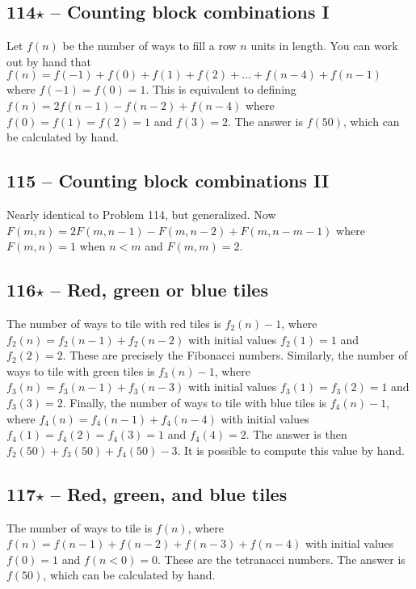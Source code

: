 \documentclass{article}
\begin{document}
\subsection*{114$\star$ -- Counting block combinations I} 
Let $f(n)$ be the number of ways to fill a row $n$ units in length. 
You can work out by hand that $f(n) = f(-1) + f(0) + f(1) + f(2) + \dotso + f(n-4) + f(n-1)$ where $f(-1) = f(0) = 1$. 
This is equivalent to defining $f(n) = 2f(n-1) - f(n-2) + f(n-4)$ where $f(0) = f(1) = f(2) = 1$ and $f(3) = 2$. 
The answer is $f(50)$, which can be calculated by hand.

\subsection*{115 -- Counting block combinations II} 
Nearly identical to Problem 114, but generalized. 
Now $F(m, n) = 2F(m, n-1) - F(m, n-2) + F(m, n-m-1)$ where $F(m, n) = 1$ when $n < m$ and $F(m, m) = 2$.

\subsection*{116$\star$ -- Red, green or blue tiles} 
The number of ways to tile with red tiles is $f_2(n)-1$, where $f_2(n) = f_2(n-1) + f_2(n-2)$ with initial values $f_2(1) = 1$ and $f_2(2) = 2$. 
These are precisely the Fibonacci numbers. 
Similarly, the number of ways to tile with green tiles is $f_3(n)-1$, where $f_3(n) = f_3(n-1) + f_3(n-3)$ with initial values $f_3(1) = f_3(2) = 1$ and $f_3(3) = 2$.  
Finally, the number of ways to tile with blue tiles is $f_4(n)-1$, where $f_4(n) = f_4(n-1) + f_4(n-4)$ with initial values $f_4(1) = f_4(2) = f_4(3) = 1$ and $f_4(4) = 2$. 
The answer is then $f_2(50) + f_3(50) + f_4(50) - 3$. 
It is possible to compute this value by hand.

\subsection*{117$\star$ -- Red, green, and blue tiles} 
The number of ways to tile is $f(n)$, where $f(n) = f(n-1) + f(n-2) + f(n-3) + f(n-4)$ with initial values $f(0) = 1$ and $f(n<0) = 0$. 
These are the tetranacci numbers. 
The answer is $f(50)$, which can be calculated by hand.
\end{document}
